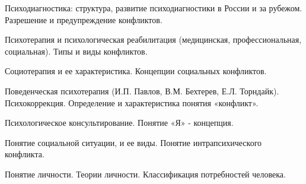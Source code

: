 \documentclass[
	14pt,
	a4paper,
	]
	{scrartcl}
\begin{document}
\newpage


\shapk
{}
\setcounter{zad}{0}

\vfill
\z Психодиагностика: структура, развитие психодиагностики в России и за рубежом. 
 \vfill
\z Разрешение и предупреждение конфликтов.
 \vfill

\vfill

\newpage


\shapk
{}
\setcounter{zad}{0}

\vfill
\z Психотерапия и психологическая реабилитация (медицинская, профессиональная, социальная).
 \vfill
\z Типы и виды конфликтов.
 \vfill

\vfill

\newpage


\shapk
{}
\setcounter{zad}{0}

\vfill
\z Социотерапия и ее характеристика.
 \vfill
\z Концепции социальных конфликтов.
 \vfill

\vfill

\newpage


\shapk
{}
\setcounter{zad}{0}

\vfill
\z Поведенческая психотерапия (И.П. Павлов, В.М. Бехтерев, Е.Л. Торндайк). Психокоррекция.
 \vfill
\z Определение и характеристика понятия «конфликт».
 \vfill

\vfill

\newpage


\shapk
{}
\setcounter{zad}{0}

\vfill
\z Психологическое консультирование.
 \vfill
\z Понятие «Я» - концепция.
 \vfill

\vfill

\newpage


\shapk
{}
\setcounter{zad}{0}

\vfill
\z Понятие социальной ситуации, и ее виды.
 \vfill
\z Понятие интрапсихического конфликта.
 \vfill

\vfill

\newpage


\shapk
{}
\setcounter{zad}{0}

\vfill
\z Понятие личности. Теории личности.
 \vfill
\z Классификация потребностей человека.
 \vfill

\vfill

\newpage


\shapk
{}
\setcounter{zad}{0}
\end{document}
